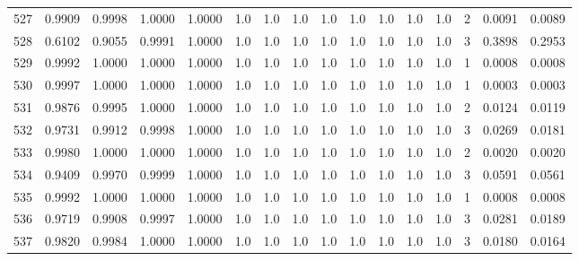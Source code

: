 \begin{tabular}{lrrrrrrrrrrrrrrr}
527 &      0.9909 &  0.9998 &  1.0000 &  1.0000 &     1.0 &     1.0 &     1.0 &     1.0 &     1.0 &     1.0 &      1.0 &        1.0 &      2 &                    0.0091 &                     0.0089 \\
528 &      0.6102 &  0.9055 &  0.9991 &  1.0000 &     1.0 &     1.0 &     1.0 &     1.0 &     1.0 &     1.0 &      1.0 &        1.0 &      3 &                    0.3898 &                     0.2953 \\
529 &      0.9992 &  1.0000 &  1.0000 &  1.0000 &     1.0 &     1.0 &     1.0 &     1.0 &     1.0 &     1.0 &      1.0 &        1.0 &      1 &                    0.0008 &                     0.0008 \\
530 &      0.9997 &  1.0000 &  1.0000 &  1.0000 &     1.0 &     1.0 &     1.0 &     1.0 &     1.0 &     1.0 &      1.0 &        1.0 &      1 &                    0.0003 &                     0.0003 \\
531 &      0.9876 &  0.9995 &  1.0000 &  1.0000 &     1.0 &     1.0 &     1.0 &     1.0 &     1.0 &     1.0 &      1.0 &        1.0 &      2 &                    0.0124 &                     0.0119 \\
532 &      0.9731 &  0.9912 &  0.9998 &  1.0000 &     1.0 &     1.0 &     1.0 &     1.0 &     1.0 &     1.0 &      1.0 &        1.0 &      3 &                    0.0269 &                     0.0181 \\
533 &      0.9980 &  1.0000 &  1.0000 &  1.0000 &     1.0 &     1.0 &     1.0 &     1.0 &     1.0 &     1.0 &      1.0 &        1.0 &      2 &                    0.0020 &                     0.0020 \\
534 &      0.9409 &  0.9970 &  0.9999 &  1.0000 &     1.0 &     1.0 &     1.0 &     1.0 &     1.0 &     1.0 &      1.0 &        1.0 &      3 &                    0.0591 &                     0.0561 \\
535 &      0.9992 &  1.0000 &  1.0000 &  1.0000 &     1.0 &     1.0 &     1.0 &     1.0 &     1.0 &     1.0 &      1.0 &        1.0 &      1 &                    0.0008 &                     0.0008 \\
536 &      0.9719 &  0.9908 &  0.9997 &  1.0000 &     1.0 &     1.0 &     1.0 &     1.0 &     1.0 &     1.0 &      1.0 &        1.0 &      3 &                    0.0281 &                     0.0189 \\
537 &      0.9820 &  0.9984 &  1.0000 &  1.0000 &     1.0 &     1.0 &     1.0 &     1.0 &     1.0 &     1.0 &      1.0 &        1.0 &      3 &                    0.0180 &                     0.0164 \\

\end{tabular}
